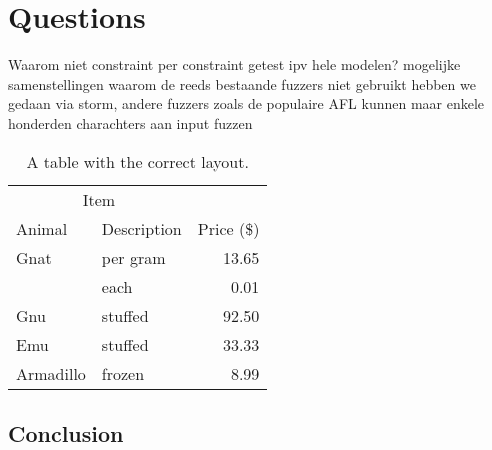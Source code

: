 \chapter{Questions}
Waarom niet constraint per constraint getest ipv hele modelen?
	mogelijke samenstellingen 
waarom de reeds bestaande fuzzers niet gebruikt
	hebben we gedaan via storm, andere fuzzers zoals de populaire AFL kunnen maar enkele honderden  charachters aan input fuzzen

%
%
%
\begin{table}
		\centering
		\begin{tabular}{@{}llr@{}} \toprule
				\multicolumn{2}{c}{Item} \\ \cmidrule(r){1-2}
				Animal    & Description & Price (\$)\\ \midrule
				Gnat      & per gram    & 13.65 \\
				& each        & 0.01 \\
				Gnu       & stuffed     & 92.50 \\
				Emu       & stuffed     & 33.33 \\
				Armadillo & frozen      & 8.99 \\ \bottomrule
			\end{tabular}
		\caption{A table with the correct layout.}
		\label{tab:ok}
	\end{table}


\section{Conclusion}

